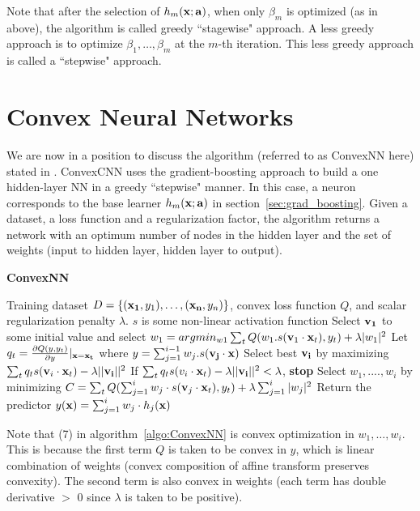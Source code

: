 \documentclass{article}
\begin{document}
Note that after the selection of $h_m({\bf x; a})$, when only $\beta_m$ is optimized (as in above), the algorithm is called greedy ``stagewise" approach. A less greedy approach is to optimize $\beta_1, \dots, \beta_m$ at the $m$-th iteration. This less greedy approach is called a ``stepwise" approach.   

\section{Convex Neural Networks}

We are now in a position to discuss the algorithm (referred to as ConvexNN here) stated in \cite{bengio2005convex}. ConvexCNN uses the gradient-boosting approach to build a one hidden-layer NN in a greedy ``stepwise" manner. In this case, a neuron corresponds to the base learner $h_m({\bf x; a})$ in section~\ref{sec:grad_boosting}. Given a dataset, a loss function and a regularization factor, the algorithm returns a network with an optimum number of nodes in the hidden layer and the set of weights (input to hidden layer, hidden layer to output).

\begin{algorithm}
\caption{{\bf ConvexNN}}\label{algo:ConvexNN}
\begin{algorithmic}[1]
 Training dataset $D = \{({\bf x_1}, y_1), \dots, ({\bf x_n}, y_n)\}$, convex loss function $Q$, and scalar regularization penalty $\lambda$. $s$ is some non-linear activation function 
\STATE Select ${\bf v_1}$ to some initial value and select $w_1 = argmin_{w1} \sum_t Q(w_1.s({\bf v}_1 \cdot {\bf x}_t), y_t) + \lambda |w_1|^2$
\STATE Let $q_t = \frac{\partial Q(y, y_t)}{\partial y}|_{\bf x = x_t}$ where $y = \sum_{j = 1}^{i - 1} w_j . s({\bf v_j} \cdot \bf{x})$
\STATE Select best ${\bf v_i}$ by maximizing $\sum_{t} q_t s({\bf v}_i \cdot {\bf x}_t) - \lambda ||{\bf v_i}||^2$ 
\STATE If $\sum_{t} q_t s(v_i \cdot {\bf x}_t) - \lambda ||{\bf v_i}||^2 < \lambda$, {\bf stop}
\STATE Select $w_1, ...., w_i$ by minimizing $C =  \sum_t Q(\sum_{j = 1}^{i} w_j \cdot s({\bf v}_j \cdot {\bf x}_t), y_t) + \lambda \sum_{j = 1}^{i}|w_j|^2$
\ENDFOR
\STATE Return the predictor $y({\bf x}) = \sum_{j = 1}^{i} w_j \cdot h_j({\bf x})$ 
\end{algorithmic}
\end{algorithm}

Note that (7) in algorithm~\ref{algo:ConvexNN} is convex optimization in $w_1, \dots, w_i$. This is because the first term $Q$ is taken to be convex in $y$, which is linear combination of weights (convex composition of affine transform preserves convexity). The second term is also convex in weights (each term has double derivative $>$ 0 since $\lambda$ is taken to be positive).
\end{document}
